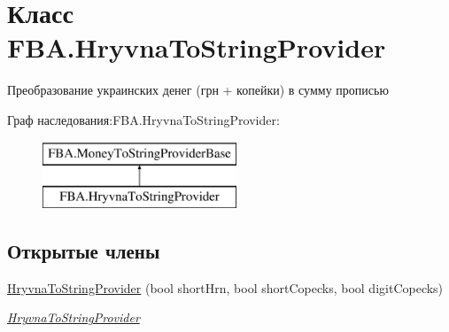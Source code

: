 \hypertarget{class_f_b_a_1_1_hryvna_to_string_provider}{}\section{Класс F\+B\+A.\+Hryvna\+To\+String\+Provider}
\label{class_f_b_a_1_1_hryvna_to_string_provider}


Преобразование украинских денег (грн + копейки) в сумму прописью  


Граф наследования\+:F\+B\+A.\+Hryvna\+To\+String\+Provider\+:\begin{figure}[H]
\begin{center}
\leavevmode
\includegraphics[height=2.000000cm]{class_f_b_a_1_1_hryvna_to_string_provider}
\end{center}
\end{figure}
\subsection*{Открытые члены}
\begin{DoxyCompactItemize}
\item 
\mbox{\hyperlink{class_f_b_a_1_1_hryvna_to_string_provider_a23a15cbbae9ee5f5ac0b116493e119b0}{Hryvna\+To\+String\+Provider}} (bool short\+Hrn, bool short\+Copecks, bool digit\+Copecks)
\begin{DoxyCompactList}\small\item\em \mbox{\hyperlink{class_f_b_a_1_1_hryvna_to_string_provider}{Hryvna\+To\+String\+Provider}} \end{DoxyCompactList}\end{DoxyCompactItemize}
